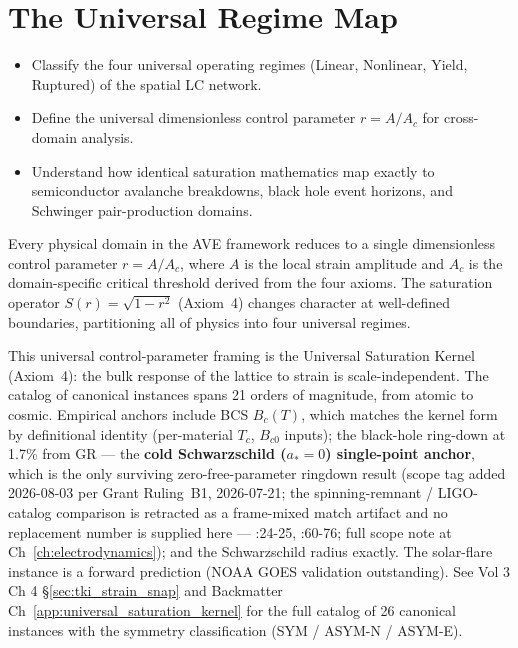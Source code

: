 \chapter{The Universal Regime Map}
\label{ch:regime_map}

\begin{objectivebox}
\begin{itemize}
    \item Classify the four universal operating regimes (Linear, Nonlinear, Yield, Ruptured) of the spatial LC network.
    \item Define the universal dimensionless control parameter $r = A/A_c$ for cross-domain analysis.
    \item Understand how identical saturation mathematics map exactly to semiconductor avalanche breakdowns, black hole event horizons, and Schwinger pair-production domains.
\end{itemize}
\end{objectivebox}

Every physical domain in the AVE framework reduces to a single dimensionless control parameter $r = A/A_c$, where $A$ is the local strain amplitude and $A_c$ is the domain-specific critical threshold derived from the four axioms. The saturation operator $S(r) = \sqrt{1 - r^2}$ (Axiom~4) changes character at well-defined boundaries, partitioning all of physics into four universal regimes.

This universal control-parameter framing is the Universal Saturation Kernel
(Axiom~4): the bulk response of the lattice to strain is scale-independent.
The catalog of canonical instances spans 21 orders of magnitude, from atomic
to cosmic. Empirical anchors include BCS $B_c(T)$, which matches the kernel
form by definitional identity (per-material $T_c$, $B_{c0}$ inputs); the
black-hole ring-down at 1.7\% from GR --- the \textbf{cold Schwarzschild
($a_* = 0$) single-point anchor}, which is the only surviving
zero-free-parameter ringdown result (scope tag added 2026-08-03 per Grant
Ruling~B1, 2026-07-21; the spinning-remnant / LIGO-catalog comparison is
retracted as a frame-mixed match artifact and no replacement number is
supplied here ---
:24-25,
:60-76; full scope note at Ch~\ref{ch:electrodynamics});
and the Schwarzschild radius exactly.
The solar-flare instance is a forward prediction (NOAA GOES validation
outstanding). See Vol 3 Ch 4 \S\ref{sec:tki_strain_snap} and
Backmatter Ch~\ref{app:universal_saturation_kernel} for the full catalog of
26 canonical instances with the symmetry classification (SYM / ASYM-N /
ASYM-E).

